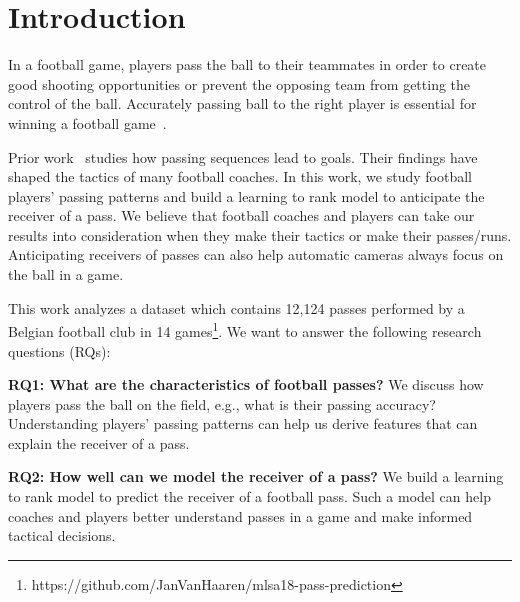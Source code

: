 \section{Introduction} \label{intro}
In a football game, players pass the ball to their teammates in order to create good shooting opportunities or prevent the opposing team from getting the control of the ball.
Accurately passing ball to the right player is essential for winning a football game~\cite{Ali2011Measuring,Hughes2005Analysis}.

Prior work~\cite{reep1968skill,Hughes2005Analysis} studies how passing sequences lead to goals. Their findings have shaped the tactics of many football coaches.
In this work, we study football players' passing patterns and build a learning to rank model to anticipate the receiver of a pass.
We believe that football coaches and players can take our results into consideration when they make their tactics or make their passes/runs. 
Anticipating receivers of passes can also help automatic cameras always focus on the ball in a game.

This work analyzes a dataset which contains 12,124 passes performed by a Belgian football club in 14 games\footnote{\label{origin_dataset}https://github.com/JanVanHaaren/mlsa18-pass-prediction}. We want to answer the following research questions (RQs): 

\begin{description}
	\item \textbf{RQ1: What are the characteristics of football passes?}
	We discuss how players pass the ball on the field, e.g., what is their passing accuracy? %
	Understanding players' passing patterns can help us derive features that can explain the receiver of a pass. 
	
	\item \textbf{RQ2: How well can we model the receiver of a pass?}
	We build a learning to rank model to predict the receiver of a football pass. 
	Such a model can help coaches and players better understand passes in a game and make informed tactical decisions.
	
\end{description}

